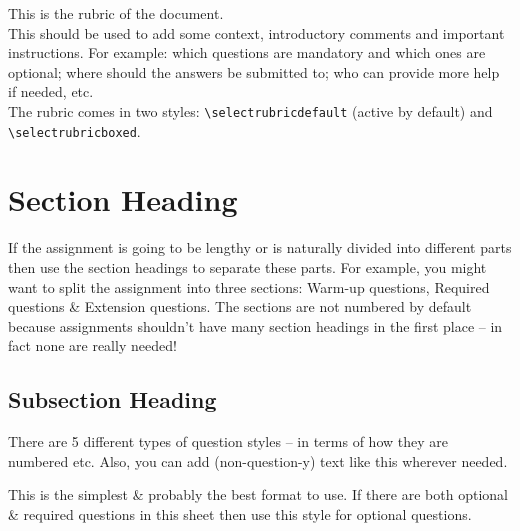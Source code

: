 \documentclass[11pt,many]{noether}
\author{Author M. Name}
\institute{University of Awesome}
\begin{document}
\maketitle

\begin{rubric}
  This is the rubric of the document.\\
  This should be used to add some context, introductory comments and important instructions. For example: which questions are mandatory and which ones are optional; where should the answers be submitted to; who can provide more help if needed, etc.\\
  The rubric comes in two styles: \small{\verb+\selectrubricdefault+} (active by default) and \small{\verb+\selectrubricboxed+}.
\end{rubric}

\section{Section Heading}
If the assignment is going to be lengthy or is naturally divided into different parts then use the section headings to separate these parts. For example, you might want to split the assignment into three sections: Warm-up questions, Required questions \& Extension questions. The sections are not numbered by default because assignments shouldn't have many section headings in the first place -- in fact none are really needed!

\subsection{Subsection Heading}

There are 5 different types of question styles -- in terms of how they are numbered etc. Also, you can add (non-question-y) text like this wherever needed.

\begin{nquest}
  This is the simplest \& probably the best format to use. If there are both optional \& required questions in this sheet then use this style for optional questions. 
\end{nquest}
\end{document}
